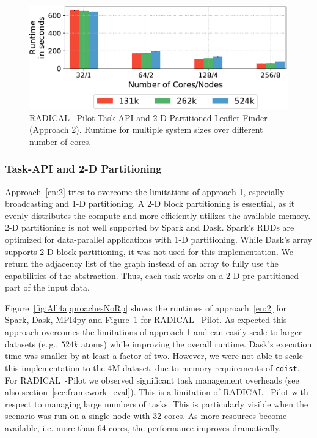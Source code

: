 

\begin{figure}[t]
    \centering
    \includegraphics[width=.95\textwidth]{figures/data_analytics_hpc/task_par/rpLF.pdf}
    \caption{RADICAL~-Pilot Task API and 2-D Partitioned Leaflet Finder (Approach 2).
    Runtime for multiple system sizes over different number of cores.}
    \label{fig:rpLF}
\end{figure}

\subsubsection*{Task-API and 2-D Partitioning}
Approach~\ref{en:2} tries to overcome the limitations of approach 1, especially broadcasting and 1-D partitioning.
A 2-D block partitioning is essential, as it evenly distributes the compute and more efficiently utilizes the available memory.
2-D partitioning is not well supported by Spark and Dask.
Spark's RDDs are optimized for data-parallel applications with 1-D partitioning.
While Dask's array supports 2-D block partitioning, it was not used for this implementation.
We return the adjacency list of the graph instead of an array to fully use the capabilities of the abstraction.
Thus, each task works on a 2-D pre-partitioned part of the input data.

Figure~\ref{fig:All4approachesNoRp} shows the runtimes of approach~\ref{en:2} for Spark, Dask, MPI4py and Figure~\ref{fig:rpLF} for RADICAL~-Pilot.
As expected this approach overcomes the limitations of approach 1 and can easily scale to larger datasets (e.\,g., $524k$ atoms) while improving the overall runtime.
Dask's execution time was smaller by at least a factor of two.
However, we were not able to scale this implementation to the 4M dataset, due to memory requirements of \texttt{cdist}.
For RADICAL~-Pilot we observed significant task management overheads (see also section~\ref{sec:framework_eval}).
This is a limitation of RADICAL~-Pilot with respect to managing large numbers of tasks.
This is particularly visible when the scenario was run on a single node with 32 cores.
As more resources become available, i.e. more than 64 cores, the performance improves dramatically.

